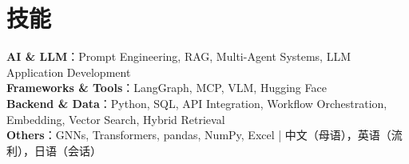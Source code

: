 \documentclass[UTF8,a4paper,10pt]{ctexart}
\begin{document}
\section{技能}
\vspace{2pt}
\small

\textbf{AI \& LLM}：Prompt Engineering, RAG, Multi-Agent Systems, LLM Application Development \\
\textbf{Frameworks \& Tools}：LangGraph, MCP, VLM, Hugging Face \\
\textbf{Backend \& Data}：Python, SQL, API Integration, Workflow Orchestration, Embedding, Vector Search, Hybrid Retrieval \\
\textbf{Others}：GNNs, Transformers, pandas, NumPy, Excel \quad | \quad 中文（母语），英语（流利），日语（会话）
\end{document}
